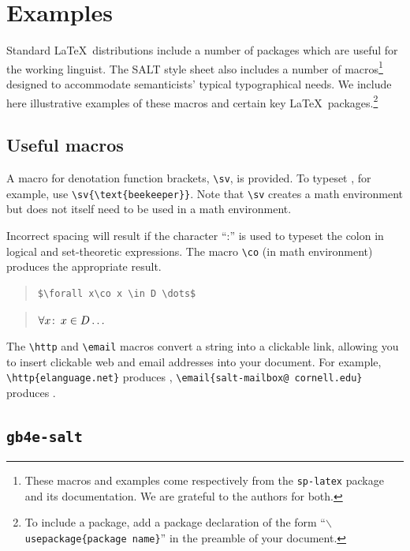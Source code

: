 \documentclass{salt}
\begin{document}
\section{Examples}\label{sec:examples}

Standard \LaTeX\ distributions include a number of packages which are useful for the working linguist. The SALT style sheet also includes a number of macros\footnote{These macros and examples come respectively from the \texttt{sp-latex} package and its documentation. We are grateful to the authors for both.} designed to accommodate semanticists' typical typographical needs. We include here illustrative examples of these macros and certain key \LaTeX\ packages.\footnote{To include a package, add a package declaration of the form ``\texttt{$\backslash$usepackage\{package name\}}'' in the preamble of your document.}

\subsection{Useful macros}

A macro for denotation function brackets, \verb+\sv+, is provided. To typeset , for example, use \verb+\sv{\text{beekeeper}}+. Note that \verb+\sv+ creates a math environment but does not itself need to be used in a math environment.

Incorrect spacing will result if the character ``:'' is used to typeset the colon in logical and set-theoretic expressions. The macro \verb+\co+ (in math environment) produces the appropriate result.

\begin{quote}
\small
\begin{verbatim}
$\forall x\co x \in D \dots$
\end{verbatim}
\end{quote}

\begin{quote}
$\forall x\colon\thinspace x \in D \dots$
\end{quote}

The \verb+\http+ and \verb+\email+ macros convert a string into a clickable link, allowing you to insert clickable web and email addresses into your document. For example, \verb+\http{elanguage.net}+ produces , \verb+\email{+\texttt{salt-mailbox@ cornell.edu}\verb+}+ produces .


\subsection{\texttt{gb4e-salt}} \label{gb4e}
\end{document}
